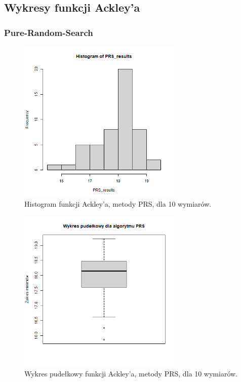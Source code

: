 \documentclass{lab}
\begin{document}
\subsection{Wykresy funkcji Ackley’a}
\subsubsection{Pure-Random-Search}
\begin{figure}[H]
  \centering
  \includegraphics[width=0.7\textwidth]{img/dim10_PRS_Ackley_his.png}
  \caption{Histogram funkcji Ackley'a, metody PRS, dla 10 wymiarów.}
\end{figure}
\begin{figure}[H]
  \centering
  \includegraphics[width=0.7\textwidth]{img/dim10_PRS_Ackley.png}
  \caption{Wykres pudełkowy funkcji Ackley'a, metody PRS, dla 10 wymiarów.}
\end{figure}
\end{document}
